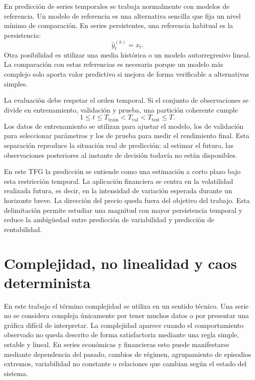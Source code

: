 En predicción de series temporales se trabaja normalmente con modelos de referencia. Un modelo de referencia es una alternativa sencilla que fija un nivel mínimo de comparación. En series persistentes, una referencia habitual es la persistencia:
\begin{equation}
    \hat{y}_t^{(h)} = x_t.
\end{equation}
Otra posibilidad es utilizar una media histórica o un modelo autorregresivo lineal. La comparación con estas referencias es necesaria porque un modelo más complejo solo aporta valor predictivo si mejora de forma verificable a alternativas simples.

La evaluación debe respetar el orden temporal. Si el conjunto de observaciones se divide en entrenamiento, validación y prueba, una partición coherente cumple
\begin{equation}
    1 \leq t \leq T_{\mathrm{train}} < T_{\mathrm{val}} < T_{\mathrm{test}} \leq T.
\end{equation}
Los datos de entrenamiento se utilizan para ajustar el modelo, los de validación para seleccionar parámetros y los de prueba para medir el rendimiento final. Esta separación reproduce la situación real de predicción: al estimar el futuro, las observaciones posteriores al instante de decisión todavía no están disponibles.

En este TFG la predicción se entiende como una estimación a corto plazo bajo esta restricción temporal. La aplicación financiera se centra en la volatilidad realizada futura, es decir, en la intensidad de variación esperada durante un horizonte breve. La dirección del precio queda fuera del objetivo del trabajo. Esta delimitación permite estudiar una magnitud con mayor persistencia temporal y reduce la ambigüedad entre predicción de variabilidad y predicción de rentabilidad.

\section{Complejidad, no linealidad y caos determinista}\label{sec:complejidad-caos}

En este trabajo el término complejidad se utiliza en un sentido técnico. Una serie no se considera compleja únicamente por tener muchos datos o por presentar una gráfica difícil de interpretar. La complejidad aparece cuando el comportamiento observado no queda descrito de forma satisfactoria mediante una regla simple, estable y lineal. En series económicas y financieras esto puede manifestarse mediante dependencia del pasado, cambios de régimen, agrupamiento de episodios extremos, variabilidad no constante o relaciones que cambian según el estado del sistema.

